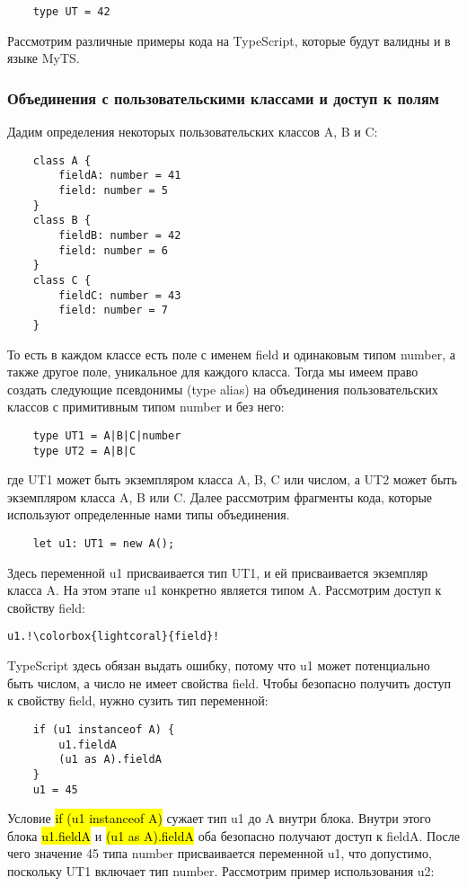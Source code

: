 \begin{lstlisting}
    type UT = 42
\end{lstlisting}

Рассмотрим различные примеры кода на TypeScript, которые будут валидны и в языке MyTS.

\subsubsection{Объединения с пользовательскими классами и доступ к полям}

Дадим определения некоторых пользовательских классов A, B и C:

\begin{lstlisting}
    class A {
        fieldA: number = 41
        field: number = 5
    }
    class B {
        fieldB: number = 42
        field: number = 6
    }
    class C {
        fieldC: number = 43
        field: number = 7
    }
\end{lstlisting}
То есть в каждом классе есть поле с именем field и одинаковым типом number, а также другое поле, уникальное для каждого
класса.
Тогда мы имеем право создать следующие псевдонимы (type alias) на объединения пользовательских классов с примитивным типом
number и без него:

\begin{lstlisting}
    type UT1 = A|B|C|number
    type UT2 = A|B|C
\end{lstlisting}
где UT1 может быть экземпляром класса A, B, C или числом, а UT2 может быть экземпляром класса A, B или C\@.
Далее рассмотрим фрагменты кода, которые используют определенные нами типы объединения.

\begin{lstlisting}
    let u1: UT1 = new A();
\end{lstlisting}
Здесь переменной u1 присваивается тип UT1, и ей присваивается экземпляр класса A\@.
На этом этапе u1 конкретно является типом A\@.
Рассмотрим доступ к свойству field:
\begin{lstlisting}[escapechar=!]
    u1.!\colorbox{lightcoral}{field}!
\end{lstlisting}
TypeScript здесь обязан выдать ошибку, потому что u1 может потенциально быть числом, а число не имеет свойства field.
Чтобы безопасно получить доступ к свойству field, нужно сузить тип переменной:

\begin{lstlisting}
    if (u1 instanceof A) {
        u1.fieldA
        (u1 as A).fieldA
    }
    u1 = 45
\end{lstlisting}
Условие \hl{if (u1 instanceof A)} сужает тип u1 до A внутри блока.
Внутри этого блока \hl{u1.fieldA} и \hl{(u1 as A).fieldA} оба безопасно получают доступ к fieldA\@.
После чего значение 45 типа number присваивается переменной u1, что допустимо, поскольку UT1 включает тип number.
Рассмотрим пример использования u2:

